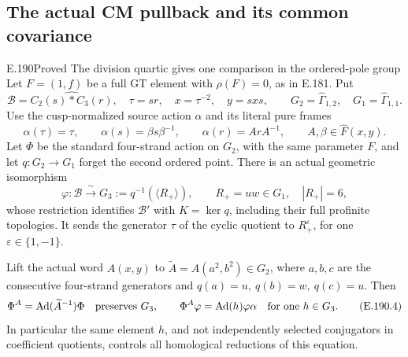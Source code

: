 \subsection{The actual CM pullback and its common covariance}

\begin{result}{E.190}{Proved}
{The division quartic gives one comparison in the ordered-pole group}
Let \(F=(1,f)\) be a full GT element with \(\rho(F)=0\), as
in E.181.  Put
\[
 \mathcal B=\widehat{C_2(s)*C_3(r)},\quad
 \tau=sr,\quad x=\tau^{-2},\quad y=sxs,
 \qquad
 G_2=\widehat\Gamma_{1,2},\quad
 G_1=\widehat\Gamma_{1,1}.
\tag{E.190.1}
\]
Use the cusp-normalized source action \(\alpha\) and its
literal pure frames
\[
 \alpha(\tau)=\tau,\qquad
 \alpha(s)=\beta s\beta^{-1},\qquad
 \alpha(r)=ArA^{-1},\qquad A,\beta\in\widehat F(x,y).
\tag{E.190.2}
\]
Let \(\Phi\) be the standard four-strand action on \(G_2\),
with the same parameter \(F\), and let \(q:G_2\to G_1\)
forget the second ordered point.  There is an actual
geometric isomorphism
\[
 \varphi:\mathcal B\xrightarrow{\ \sim\ }
 G_3:=q^{-1}(\langle R_+\rangle),\qquad
 R_+=uw\in G_1,\quad |R_+|=6,
\tag{E.190.3}
\]
whose restriction identifies \(\mathcal B'\) with
\(K=\ker q\), including their full profinite topologies.
It sends the generator \(\tau\) of the cyclic quotient
to \(R_+^\varepsilon\), for one
\(\varepsilon\in\{1,-1\}\).

Lift the actual word \(A(x,y)\) to
\(\widetilde A=A(a^2,b^2)\in G_2\), where \(a,b,c\)
are the consecutive four-strand generators and
\(q(a)=u,\ q(b)=w,\ q(c)=u\).  Then
\[
 \Phi^A=\operatorname{Ad}(\widetilde A^{-1})\Phi
 \quad\hbox{preserves }G_3,
 \qquad
 \Phi^A\varphi=\operatorname{Ad}(h)\varphi\alpha
 \quad\hbox{for one }h\in G_3.
\tag{E.190.4}
\]
In particular the same element \(h\), and not independently
selected conjugators in coefficient quotients, controls all
homological reductions of this equation.
\end{result}

